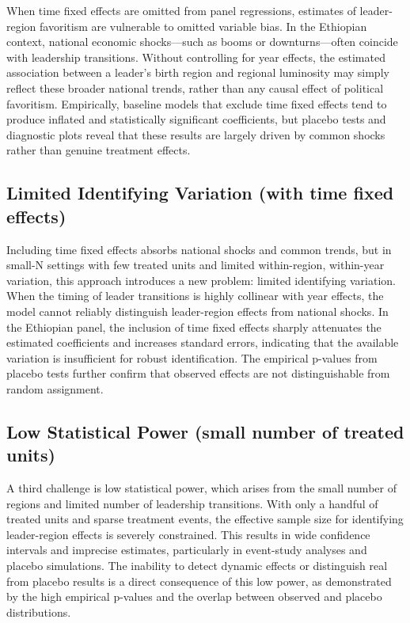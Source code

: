 \documentclass[12pt,a4paper]{article}
\begin{document}
When time fixed effects are omitted from panel regressions, estimates of leader-region favoritism are vulnerable to omitted variable bias. In the Ethiopian context, national economic shocks—such as booms or downturns—often coincide with leadership transitions. Without controlling for year effects, the estimated association between a leader’s birth region and regional luminosity may simply reflect these broader national trends, rather than any causal effect of political favoritism. Empirically, baseline models that exclude time fixed effects tend to produce inflated and statistically significant coefficients, but placebo tests and diagnostic plots reveal that these results are largely driven by common shocks rather than genuine treatment effects.

\subsection{Limited Identifying Variation (with time fixed effects)}

Including time fixed effects absorbs national shocks and common trends, but in small-N settings with few treated units and limited within-region, within-year variation, this approach introduces a new problem: limited identifying variation. When the timing of leader transitions is highly collinear with year effects, the model cannot reliably distinguish leader-region effects from national shocks. In the Ethiopian panel, the inclusion of time fixed effects sharply attenuates the estimated coefficients and increases standard errors, indicating that the available variation is insufficient for robust identification. The empirical p-values from placebo tests further confirm that observed effects are not distinguishable from random assignment.

\subsection{Low Statistical Power (small number of treated units)}

A third challenge is low statistical power, which arises from the small number of regions and limited number of leadership transitions. With only a handful of treated units and sparse treatment events, the effective sample size for identifying leader-region effects is severely constrained. This results in wide confidence intervals and imprecise estimates, particularly in event-study analyses and placebo simulations. The inability to detect dynamic effects or distinguish real from placebo results is a direct consequence of this low power, as demonstrated by the high empirical p-values and the overlap between observed and placebo distributions.
\end{document}
